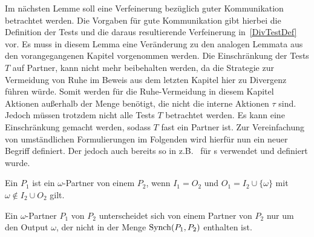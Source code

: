 
Im nächsten Lemme soll eine Verfeinerung bezüglich guter Kommunikation
betrachtet werden. Die Vorgaben für gute Kommunikation gibt hierbei die
Definition der Tests und die daraus resultierende Verfeinerung
in~\ref{DivTestDef} vor. Es muss in diesem Lemma eine Veränderung zu den
analogen Lemmata aus den vorangegangenen Kapitel vorgenommen werden. Die
Einschränkung der Tests $T$ auf Partner, kann nicht mehr beibehalten werden, da
die Strategie zur Vermeidung von Ruhe im Beweis aus dem letzten Kapitel hier zu
Divergenz führen würde. Somit werden für die Ruhe-Vermeidung in diesem Kapitel
Aktionen außerhalb der Menge \Synch{} benötigt, die nicht die interne Aktionen
$\tau$ sind. Jedoch müssen trotzdem nicht alle Tests $T$ betrachtet werden. Es
kann eine Einschränkung gemacht werden, sodass $T$ fast ein Partner ist. Zur
Vereinfachung von umständlichen Formulierungen im Folgenden wird hierfür nun
ein neuer Begriff definiert. Der jedoch auch bereits so in
z.B.~\cite{Schinko2016BA} für \EIO{}s verwendet und definiert wurde.

\begin{Def}
  Ein \MEIO{} $P_1$ ist ein $\omega$-Partner von einem \MEIO{} $P_2$, wenn
  $I_1=O_2$ und $O_1=I_2\cup\{\omega\}$ mit $\omega\notin I_2\cup O_2$ gilt.
\end{Def}

Ein $\omega$-Partner $P_1$ von $P_2$ unterscheidet sich von einem Partner von
$P_2$ nur um den Output $\omega$, der nicht in der Menge $\mathrm{Synch} (P_1,P_2)$
enthalten ist.

